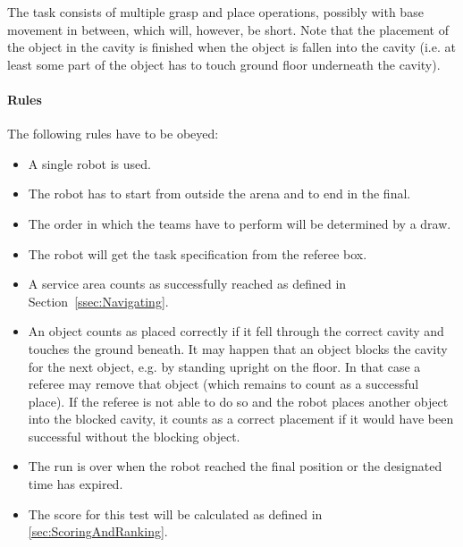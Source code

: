 The task consists of multiple grasp and place operations, possibly with base movement in between, which will, however, be short. Note that the placement of the object in the cavity is finished when the object is fallen into the cavity (i.e. at least some part of the object has to touch ground floor underneath the cavity).

%
%
%

\paragraph{Rules}
The following rules have to be obeyed:

\begin{itemize}

\item A single robot is used.
\item The robot has to start from outside the arena and to end in the final.
\item The order in which the teams have to perform will be determined by a draw.
\item The robot will get the task specification from the referee box.
\item A service area counts as successfully reached as defined in Section~\ref{ssec:Navigating}.
\item An object counts as placed correctly if it fell through the correct cavity and touches the ground beneath. It may happen that an object blocks the cavity for the next object, e.g. by standing upright on the floor. In that case a referee may remove that object (which remains to count as a successful place). If the referee is not able to do so and the robot places another object into the blocked cavity, it counts as a correct placement if it would have been successful without the blocking object.
\item The run is over when the robot reached the final position or the designated time has expired.
\item The score for this test will be calculated as defined in \ref{sec:ScoringAndRanking}.

\end{itemize}

